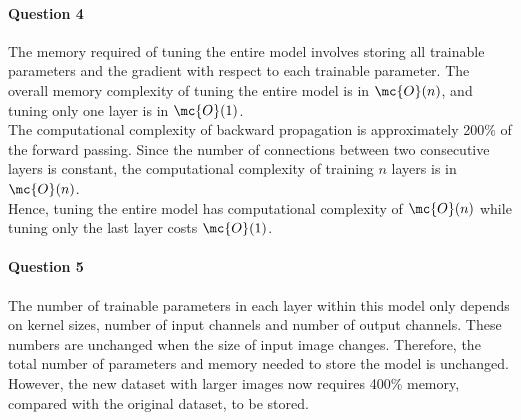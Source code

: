 \documentclass[12pt]{article}
\begin{document}
	\begin{figure}[H]
		\centering
	\end{figure}

	\paragraph{Question 4} The memory required of tuning the entire model involves storing all trainable parameters and the gradient with respect to each trainable parameter. The overall memory complexity of tuning the entire model is in $\mc{O}(n)$, and tuning only one layer is in $\mc{O}(1)$. \\
	The computational complexity of backward propagation is approximately 200\% of the forward passing. Since the number of connections between two consecutive layers is constant, the computational complexity of training $n$ layers is in $\mc{O}(n)$. \\
	Hence, tuning the entire model has computational complexity of $\mc{O}(n)$ while tuning only the last layer costs $\mc{O}(1)$.
	
	\paragraph{Question 5} The number of trainable parameters in each layer within this model only depends on kernel sizes, number of input channels and number of output channels. These numbers are unchanged when the size of input image changes. Therefore, the total number of parameters and memory needed to store the model is unchanged. However, the new dataset with larger images now requires 400\% memory, compared with the original dataset, to be stored.
\end{document}
